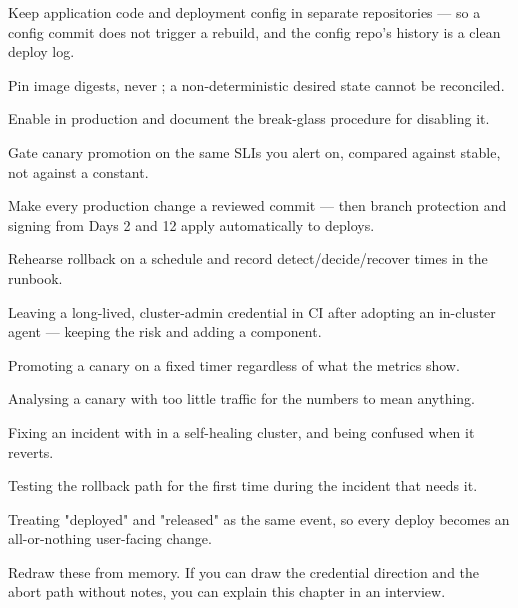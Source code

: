 \begin{bestpractices}
\begin{wbitem}
  \item Keep application code and deployment config in separate repositories --- so a config commit does not trigger a rebuild, and the config repo's history is a clean deploy log.
  \item Pin image digests, never ; a non-deterministic desired state cannot be reconciled.
  \item Enable  in production and document the break-glass procedure for disabling it.
  \item Gate canary promotion on the same SLIs you alert on, compared against stable, not against a constant.
  \item Make every production change a reviewed commit --- then branch protection and signing from Days 2 and 12 apply automatically to deploys.
  \item Rehearse rollback on a schedule and record detect/decide/recover times in the runbook.
\end{wbitem}
\end{bestpractices}
\begin{mistakes}
\begin{wbitem}
  \item Leaving a long-lived, cluster-admin credential in CI after adopting an in-cluster agent --- keeping the risk and adding a component.
  \item Promoting a canary on a fixed timer regardless of what the metrics show.
  \item Analysing a canary with too little traffic for the numbers to mean anything.
  \item Fixing an incident with  in a self-healing cluster, and being confused when it reverts.
  \item Testing the rollback path for the first time during the incident that needs it.
  \item Treating "deployed" and "released" as the same event, so every deploy becomes an all-or-nothing user-facing change.
\end{wbitem}
\end{mistakes}


Redraw these from memory. If you can draw the credential direction and the abort path without notes, you can explain this chapter in an interview.

